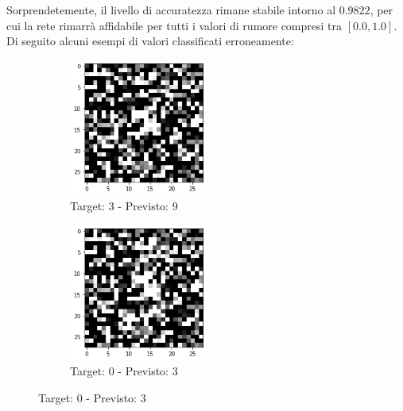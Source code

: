 \documentclass[12pt, a4paper]{article}
\begin{document}
Sorprendetemente, il livello di accuratezza rimane stabile intorno al \(0.9822\), per cui la rete rimarrà affidabile per tutti i valori di rumore compresi tra \([0.0, 1.0]\).\\
Di seguito alcuni esempi di valori classificati erroneamente:
\begin{figure}[H]
    \begin{subfigure}{0.5\textwidth}
        \centering
        \caption{Target: 3 - Previsto: 9}
        \includegraphics[width=0.5\textwidth]{ErrConv1.png}
    \end{subfigure}
    \begin{subfigure}{0.5\textwidth}
        \centering
        \caption{Target: 0 - Previsto: 3}
        \includegraphics[width=0.5\textwidth]{ErrConv2.png}
    \end{subfigure}
\end{figure}
\end{document}
